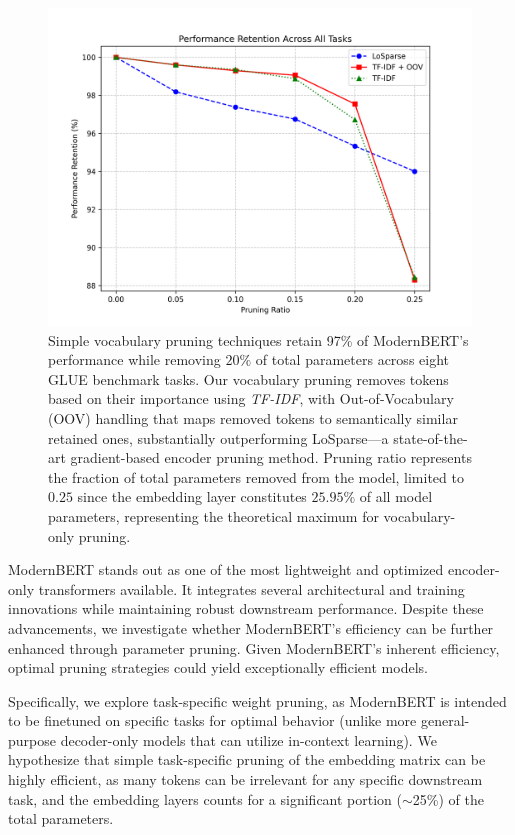 \documentclass[twocolumn]{article}
\begin{document}
\begin{figure}[t]
\centering
\includegraphics[width=\columnwidth]{images/performance_retention.png}
\caption{Simple vocabulary pruning techniques retain \raisebox{0.2ex}{\scalebox{0.8}{$>$}}97\% of ModernBERT's performance while removing $20\%$ of total parameters across eight GLUE benchmark tasks. Our vocabulary pruning removes tokens based on their importance using \textit{TF-IDF}, with Out-of-Vocabulary (OOV) handling that maps removed tokens to semantically similar retained ones, substantially outperforming LoSparse---a state-of-the-art gradient-based encoder pruning method. Pruning ratio represents the fraction of total parameters removed from the model, limited to $0.25$ since the embedding layer constitutes $25.95\%$ of all model parameters, representing the theoretical maximum for vocabulary-only pruning.}
\label{fig:pruning_retention}
\end{figure}

ModernBERT stands out as one of the most lightweight and optimized encoder-only transformers available. It integrates several architectural and training innovations while maintaining robust downstream performance. Despite these advancements, we investigate whether ModernBERT's efficiency can be further enhanced through parameter pruning. Given ModernBERT's inherent efficiency, optimal pruning strategies could yield exceptionally efficient models.

Specifically, we explore task-specific weight pruning, as ModernBERT is intended to be finetuned on specific tasks for optimal behavior (unlike more general-purpose decoder-only models that can utilize in-context learning). We hypothesize that simple task-specific pruning of the embedding matrix can be highly efficient, as many tokens can be irrelevant for any specific downstream task, and the embedding layers counts for a significant portion ($\sim$25\%) of the total parameters.
\end{document}

